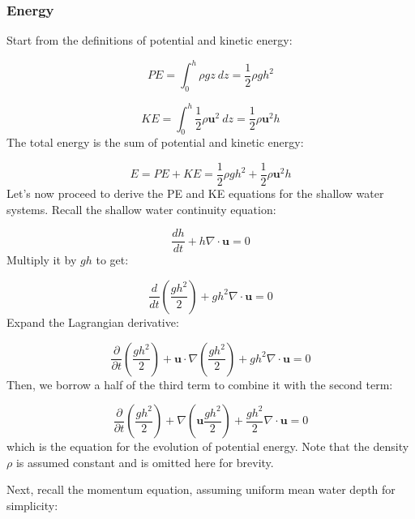 \documentclass[12pt]{article}
\numberwithin{equation}{section}
\numberwithin{figure}{section}
\numberwithin{table}{section}
\begin{document}
\subsubsection{Energy}

Start from the definitions of potential and kinetic energy:

\begin{equation}
  PE = \int_0^h \rho g z\ dz = \frac{1}{2} \rho g h^2
\end{equation}

\begin{equation}
  KE = \int_0^h \frac{1}{2} \rho \mathbf{u}^2\ dz = \frac{1}{2} \rho \mathbf{u}^2 h
\end{equation}
The total energy is the sum of potential and kinetic energy:

\begin{equation}
  E = PE + KE = \frac{1}{2} \rho g h^2 + \frac{1}{2} \rho \mathbf{u}^2 h
\end{equation}
Let's now proceed to derive the PE and KE equations for the shallow water
systems.
Recall the shallow water continuity equation:

\begin{equation}
  \frac{dh}{dt} + h \nabla \cdot \mathbf{u} = 0
\end{equation}
Multiply it by $gh$ to get:

\begin{equation}
  \frac{d}{dt} \left( \frac{gh^2}{2} \right) + gh^2 \nabla \cdot \mathbf{u} = 0
\end{equation}
Expand the Lagrangian derivative:

\begin{equation}
  \frac{\partial}{\partial t} \left( \frac{gh^2}{2} \right) +
  \mathbf{u} \cdot \nabla \left( \frac{gh^2}{2} \right) +
  gh^2 \nabla \cdot \mathbf{u} = 0
\end{equation}
Then, we borrow a half of the third term to combine it with the second term:

\begin{equation}
  \frac{\partial}{\partial t} \left( \frac{gh^2}{2} \right) +
  \nabla \left( \mathbf{u} \frac{gh^2}{2} \right) +
  \frac{gh^2}{2} \nabla \cdot \mathbf{u} = 0
  \label{eq:swe_potential_energy}
\end{equation}
which is the equation for the evolution of potential energy.
Note that the density $\rho$ is assumed constant and is omitted here for brevity.

Next, recall the momentum equation, assuming uniform mean water depth for
simplicity:
\end{document}
